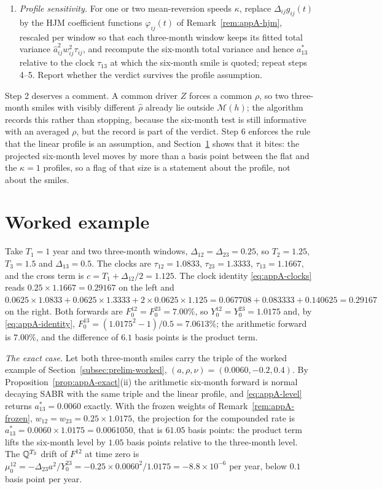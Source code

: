 \documentclass[../../main.tex]{subfiles}
\begin{document}
\begin{algorithmenv}
\begin{enumerate}[nosep,label=\arabic*.]
\item \emph{Profile sensitivity.} For one or two mean-reversion speeds $\kappa$, replace $\Delta_{ij}g_{ij}(t)$ by the HJM coefficient functions $\varphi_{ij}(t)$ of Remark~\ref{rem:appA-hjm}, rescaled per window so that each three-month window keeps its fitted total variance $\hat a_{ij}^2w_{ij}^2\tau_{ij}$, and recompute the six-month total variance and hence $a_{13}^*$ relative to the clock $\tau_{13}$ at which the six-month smile is quoted; repeat steps 4--5. Report whether the verdict survives the profile assumption.
\end{enumerate}
\end{algorithmenv}

Step 2 deserves a comment. A common driver $Z$ forces a common $\rho$, so two three-month smiles with visibly different $\hat\rho$ already lie outside $\mathcal M(h)$; the algorithm records this rather than stopping, because the six-month test is still informative with an averaged $\rho$, but the record is part of the verdict. Step 6 enforces the rule that the linear profile is an assumption, and Section~\ref{sec:appA-worked} shows that it bites: the projected six-month level moves by more than a basis point between the flat and the $\kappa=1$ profiles, so a flag of that size is a statement about the profile, not about the smiles.

\section{Worked example}\label{sec:appA-worked}

Take $T_1=1$ year and two three-month windows, $\Delta_{12}=\Delta_{23}=0.25$, so $T_2=1.25$, $T_3=1.5$ and $\Delta_{13}=0.5$. The clocks are $\tau_{12}=1.0833$, $\tau_{23}=1.3333$, $\tau_{13}=1.1667$, and the cross term is $c=T_1+\Delta_{12}/2=1.125$. The clock identity \eqref{eq:appA-clocks} reads $0.25\times1.1667=0.29167$ on the left and $0.0625\times1.0833+0.0625\times1.3333+2\times0.0625\times1.125=0.067708+0.083333+0.140625=0.29167$ on the right. Both forwards are $F^{12}_0=F^{23}_0=7.00\%$, so $Y^{12}_0=Y^{23}_0=1.0175$ and, by \eqref{eq:appA-identity}, $F^{13}_0=(1.0175^2-1)/0.5=7.0613\%$; the arithmetic forward is $7.00\%$, and the difference of $6.1$ basis points is the product term.

\emph{The exact case.} Let both three-month smiles carry the triple of the worked example of Section~\ref{subsec:prelim-worked}, $(a,\rho,\nu)=(0.0060,-0.2,0.4)$. By Proposition~\ref{prop:appA-exact}(ii) the arithmetic six-month forward is normal decaying SABR with the same triple and the linear profile, and \eqref{eq:appA-level} returns $a_{13}^*=0.0060$ exactly. With the frozen weights of Remark~\ref{rem:appA-frozen}, $w_{12}=w_{23}=0.25\times1.0175$, the projection for the compounded rate is $a_{13}^*=0.0060\times1.0175=0.0061050$, that is $61.05$ basis points: the product term lifts the six-month level by $1.05$ basis points relative to the three-month level. The $\mathbb{Q}^{T_3}$ drift of $F^{12}$ at time zero is $\mu^{12}_0=-\Delta_{23}a^2/Y^{23}_0=-0.25\times0.0060^2/1.0175=-8.8\times10^{-6}$ per year, below $0.1$ basis point per year.
\end{document}
